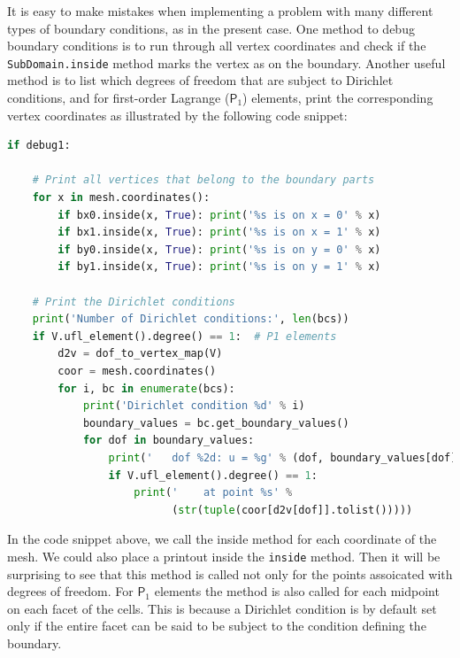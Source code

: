 \documentclass[graybox,envcountchap,sectrefs,final]{svmonodo}
\newenvironment{notice_mdfboxadmon}[1][]{
\begin{notice_mdfboxmdframed}[frametitle=#1]
}
{
\end{notice_mdfboxmdframed}
}
\begin{document}
It is easy to make mistakes when implementing a problem with many
different types of boundary conditions, as in the present case. One
method to debug boundary conditions is to run through all vertex
coordinates and check if the \texttt{SubDomain.inside} method marks the
vertex as on the boundary. Another useful method is to list which
degrees of freedom that are subject to Dirichlet conditions, and for
first-order Lagrange ($\mathsf{P}_1$) elements, print the
corresponding vertex coordinates as illustrated by the following
code snippet:

\begin{lstlisting}[language=Python,style=graycolor]
if debug1:

    # Print all vertices that belong to the boundary parts
    for x in mesh.coordinates():
        if bx0.inside(x, True): print('%s is on x = 0' % x)
        if bx1.inside(x, True): print('%s is on x = 1' % x)
        if by0.inside(x, True): print('%s is on y = 0' % x)
        if by1.inside(x, True): print('%s is on y = 1' % x)

    # Print the Dirichlet conditions
    print('Number of Dirichlet conditions:', len(bcs))
    if V.ufl_element().degree() == 1:  # P1 elements
        d2v = dof_to_vertex_map(V)
        coor = mesh.coordinates()
        for i, bc in enumerate(bcs):
            print('Dirichlet condition %d' % i)
            boundary_values = bc.get_boundary_values()
            for dof in boundary_values:
                print('   dof %2d: u = %g' % (dof, boundary_values[dof]))
                if V.ufl_element().degree() == 1:
                    print('    at point %s' %
                          (str(tuple(coor[d2v[dof]].tolist()))))
\end{lstlisting}


\begin{notice_mdfboxadmon}
In the code snippet above, we call the inside method for each
coordinate of the mesh. We could also place a printout inside the
\texttt{inside} method. Then it will be surprising to see that this method is
called not only for the points assoicated with degrees of freedom.
For $\mathsf{P}_1$ elements the method is also called for each
midpoint on each facet of the cells. This is because a Dirichlet
condition is by default set only if the entire facet can be said to be
subject to the condition defining the boundary.
\end{notice_mdfboxadmon} %
\end{document}
